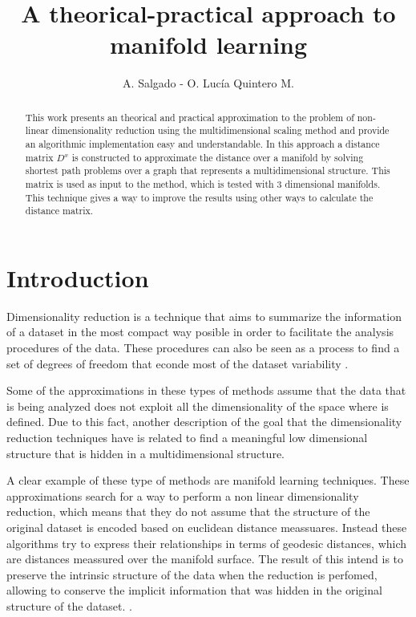 \documentclass[12pt,journal]{IEEEtran}
\begin{document}
\title{A theorical-practical approach to manifold learning}
\author{A. Salgado - O. Lucía Quintero M.}
\maketitle

\begin{abstract}
    This work presents an theorical and practical approximation to the problem
    of non-linear dimensionality reduction using the multidimensional scaling
    method and provide an algorithmic implementation easy and understandable. In
    this approach a distance matrix $D^x$ is constructed to approximate the
    distance over a manifold by solving shortest path problems over a graph that
    represents a multidimensional structure. This matrix is used as input to the
    method, which is tested with 3 dimensional manifolds. This technique gives a
    way to improve the results using other ways to calculate the distance matrix.
\end{abstract}

\section{Introduction}

Dimensionality reduction is a technique that aims to summarize the information
of a dataset in the most compact way posible in order to facilitate the analysis
procedures of the data. These procedures can also be seen as a process to find
a set of degrees of freedom that econde most of the dataset variability
\cite{proof}.

\vspace{0.5cm}

Some of the approximations in these types of methods assume that the data that
is being analyzed does not exploit all the dimensionality of the space where
is defined. Due to this fact, another description of the goal that the
dimensionality reduction techniques have is related to find a meaningful low
dimensional structure that is hidden in a multidimensional structure.
\cite{dimension}

\vspace{0.5cm}

A clear example of these type of methods are manifold learning techniques. These
approximations search for a way to perform a non linear dimensionality reduction,
which means that they do not assume that the structure of the original dataset
is encoded based on euclidean distance meassuares. Instead these algorithms try
to express their relationships in terms of geodesic distances, which are
distances meassured over the manifold surface. The result of this intend is
to preserve the intrinsic structure of the data when the reduction is perfomed,
allowing to conserve the implicit information that was hidden in the original
structure of the dataset. \cite{manifold}.
\end{document}
